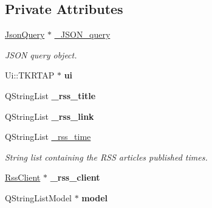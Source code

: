 \subsection*{Private Attributes}
\begin{DoxyCompactItemize}
\item 
\hypertarget{class_t_k_r_t_a_p_a6bbf119b4d676391d255cccff61fd3db}{\hyperlink{class_json_query}{Json\+Query} $\ast$ \hyperlink{class_t_k_r_t_a_p_a6bbf119b4d676391d255cccff61fd3db}{\+\_\+\+J\+S\+O\+N\+\_\+query}}\label{class_t_k_r_t_a_p_a6bbf119b4d676391d255cccff61fd3db}

\begin{DoxyCompactList}\small\item\em J\+S\+O\+N query object. \end{DoxyCompactList}\item 
\hypertarget{class_t_k_r_t_a_p_aa5c0808ed62d03e2429251f24ce9f1ed}{Ui\+::\+T\+K\+R\+T\+A\+P $\ast$ {\bfseries ui}}\label{class_t_k_r_t_a_p_aa5c0808ed62d03e2429251f24ce9f1ed}

\item 
\hypertarget{class_t_k_r_t_a_p_ae1b640da392aa1223efadd00e9ab18ef}{Q\+String\+List {\bfseries \+\_\+rss\+\_\+title}}\label{class_t_k_r_t_a_p_ae1b640da392aa1223efadd00e9ab18ef}

\item 
\hypertarget{class_t_k_r_t_a_p_a9ff67f4d9206e5a8b76812497c83680e}{Q\+String\+List {\bfseries \+\_\+rss\+\_\+link}}\label{class_t_k_r_t_a_p_a9ff67f4d9206e5a8b76812497c83680e}

\item 
\hypertarget{class_t_k_r_t_a_p_aecca4344eb3c1de07ee5d9269dd288ca}{Q\+String\+List \hyperlink{class_t_k_r_t_a_p_aecca4344eb3c1de07ee5d9269dd288ca}{\+\_\+rss\+\_\+time}}\label{class_t_k_r_t_a_p_aecca4344eb3c1de07ee5d9269dd288ca}

\begin{DoxyCompactList}\small\item\em String list containing the R\+S\+S articles published times. \end{DoxyCompactList}\item 
\hypertarget{class_t_k_r_t_a_p_ac88066b0fa124f52e8755b8d0e034c66}{\hyperlink{class_rss_client}{Rss\+Client} $\ast$ {\bfseries \+\_\+rss\+\_\+client}}\label{class_t_k_r_t_a_p_ac88066b0fa124f52e8755b8d0e034c66}

\item 
\hypertarget{class_t_k_r_t_a_p_a01c02cbbb5b6939837aaf07ff86c3d99}{Q\+String\+List\+Model $\ast$ {\bfseries model}}\label{class_t_k_r_t_a_p_a01c02cbbb5b6939837aaf07ff86c3d99}


\end{DoxyCompactItemize}
